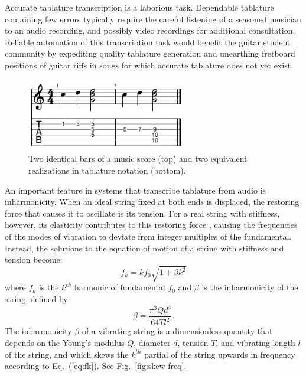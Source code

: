 \documentclass[convention,peer-reviewed]{aesconf}
\begin{document}
Accurate tablature transcription is a laborious task. Dependable tablature containing few errors typically require the careful listening of a seasoned musician to an audio recording, and possibly video recordings for additional consultation. Reliable automation of this transcription task would benefit the guitar student community by expediting quality tablature generation and unearthing fretboard positions of guitar riffs in songs for which accurate tablature does not yet exist.
\begin{figure}[!t] 
\centering
\includegraphics[width=70mm]{figs/score-tabs}
\caption{Two identical bars of a music score (top) and two equivalent realizations in tablature notation (bottom).}
\label{fig:score-tabs}
\end{figure}

An important feature in systems that transcribe tablature from audio is inharmonicity. When an ideal string fixed at both ends is displaced, the restoring force that causes it to oscillate is its tension. For a real string with stiffness, however, its elasticity contributes to this restoring force \citep{fletcher1962}, causing the frequencies of the modes of vibration to deviate from integer multiples of the fundamental. Instead, the solutions to the equation of motion of a string with stiffness and tension become: 
\begin{equation}
\label{eq:fk}
f_k = kf_{0}\sqrt{1+\beta k^2}
\end{equation}
where $f_k$ is the $k^{th}$ harmonic of fundamental $f_0$ and $\beta$ is the inharmonicity of the string, defined by
\begin{equation}
\beta = \frac{\pi^3 Q d^4}{64 T l^2}. \label{eq:beta}
\end{equation}
The inharmonicity $\beta$ of a vibrating string is a dimensionless quantity that depends on the Young's modulus $Q$, diameter $d$, tension $T$, and vibrating length $l$ of the string, and which skews the $k^{th}$ partial of the string upwards in frequency according to Eq.~(\ref{eq:fk}). See Fig.~\ref{fig:skew-freq}. 
\end{document}
